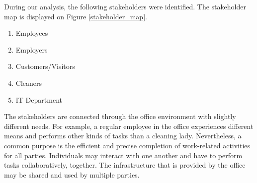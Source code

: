 During our analysis, the following stakeholders were identified. The stakeholder map is displayed on Figure \ref{stakeholder_map}. 
\begin{enumerate}
	\item Employees
	\item Employers
	\item Customers/Visitors
	\item Cleaners

	\item IT Department

\end{enumerate}

The stakeholders are connected through the office environment with slightly different needs. For example, a regular employee in the office experiences different means and performs other kinds of tasks than a cleaning lady. Nevertheless, a common purpose is the efficient and precise completion of work-related activities for all parties. Individuals may interact with one another and have to perform tasks collaboratively, together. The infrastructure that is provided by the office may be shared and used by multiple parties. 

